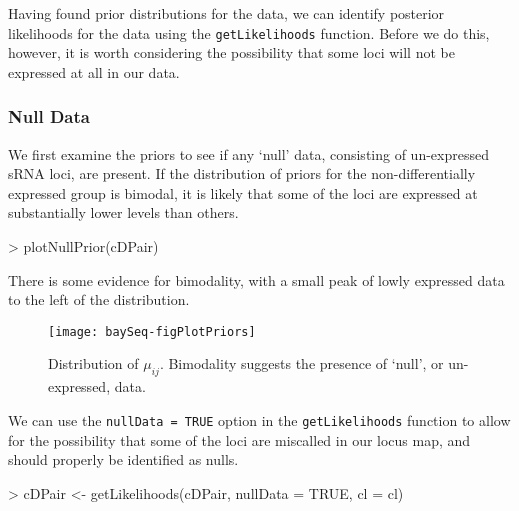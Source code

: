 \documentclass[a4paper]{article}
\begin{document}
Having found prior distributions for the data, we can identify posterior likelihoods for the data using the \verb'getLikelihoods' function. Before we do this, however, it is worth considering the possibility that some loci will not be expressed at all in our data.

\subsubsection{Null Data}

We first examine the priors to see if any `null' data, consisting of un-expressed sRNA loci, are present. If the distribution of priors for the non-differentially expressed group is bimodal, it is likely that some of the loci are expressed at substantially lower levels than others.
\begin{Schunk}
\begin{Sinput}
> plotNullPrior(cDPair)
\end{Sinput}
\end{Schunk}

There is some evidence for bimodality, with a small peak of lowly expressed data to the left of the distribution.

\begin{figure}[!ht]
\begin{center}
\texttt{[image: baySeq-figPlotPriors]}
\caption{Distribution of $\mu_{ij}$. Bimodality suggests the presence of `null', or un-expressed, data.}
\label{figMAPost}
\end{center}
\end{figure}

We can use the \verb'nullData = TRUE' option in the \verb'getLikelihoods' function to allow for the possibility that some of the loci are miscalled in our locus map, and should properly be identified as nulls.

\begin{Schunk}
\begin{Sinput}
> cDPair <- getLikelihoods(cDPair, nullData = TRUE, cl = cl)
\end{Sinput}
\end{Schunk}
\end{document}
